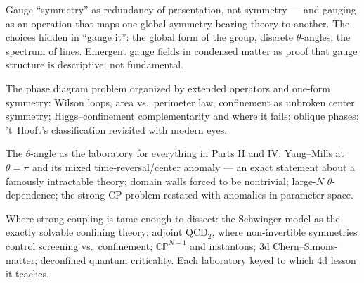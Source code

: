 Gauge ``symmetry'' as redundancy of presentation, not symmetry --- and gauging as an operation that maps one global-symmetry-bearing theory to another. The choices hidden in ``gauge it'': the global form of the group, discrete $\theta$-angles, the spectrum of lines. Emergent gauge fields in condensed matter as proof that gauge structure is descriptive, not fundamental.

The phase diagram problem organized by extended operators and one-form symmetry: Wilson loops, area vs.\ perimeter law, confinement as unbroken center symmetry; Higgs--confinement complementarity and where it fails; oblique phases; 't~Hooft's classification revisited with modern eyes.

The $\theta$-angle as the laboratory for everything in Parts II and IV: Yang--Mills at $\theta=\pi$ and its mixed time-reversal/center anomaly --- an exact statement about a famously intractable theory; domain walls forced to be nontrivial; large-$N$ $\theta$-dependence; the strong CP problem restated with anomalies in parameter space.

Where strong coupling is tame enough to dissect: the Schwinger model as the exactly solvable confining theory; adjoint QCD$_2$, where non-invertible symmetries control screening vs.\ confinement; $\mathbb{CP}^{N-1}$ and instantons; 3d Chern--Simons-matter; deconfined quantum criticality. Each laboratory keyed to which 4d lesson it teaches.

